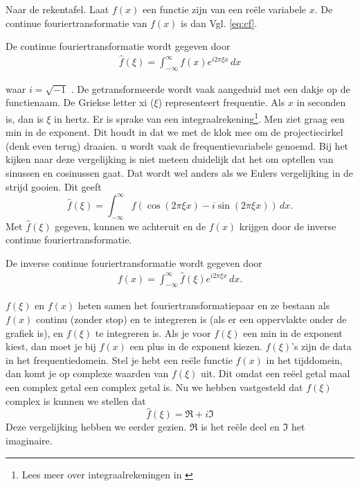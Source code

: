 \documentclass[11pt,fleqn]{book} %
\begin{document}
Naar de rekentafel. Laat $f(x)$ een functie zijn van een reële variabele $x$. De continue fouriertransformatie van $f(x)$ is dan Vgl. \ref{eq:cf}.
\begin{definition}\label{eq:cf}
De continue fouriertransformatie wordt gegeven door
\begin{align}
\hat{f}(\xi)=\int_{-\infty}^\infty f(x)e^{i2\pi \xi x} \, dx
\end{align}
\end{definition}

waar $i = \sqrt{-1}$ \cite{yy}. De getransformeerde wordt vaak aangeduid met een dakje op de functienaam. De Griekse letter xi ($\xi$) representeert frequentie. Als $x$ in seconden is, dan is $\xi$ in hertz. Er is sprake van een integraalrekening\footnote{Lees meer over integraalrekeningen in \cite{int}}. Men ziet graag een min in de exponent. Dit houdt in dat we met de klok mee om de projectiecirkel (denk even terug) draaien. u wordt vaak de frequentievariabele genoemd. Bij het kijken naar deze vergelijking is niet meteen duidelijk dat het om optellen van sinussen en cosinussen gaat. Dat wordt wel anders als we Eulers vergelijking in de strijd gooien. Dit geeft
\begin{equation*}
\hat{f}(\xi)=\int_{-\infty}^\infty f(\cos{(2\pi \xi x)}-i\sin{(2\pi \xi x)})\, dx.
\end{equation*}
Met $\hat{f}(\xi)$ gegeven, kunnen we achteruit en de $f(x)$ krijgen door de inverse continue fouriertransformatie.
\begin{definition} \label{eq:icf}
De inverse continue fouriertransformatie wordt gegeven door
\begin{align}
f(x)=\int_{-\infty}^\infty \hat{f}(\xi)e^{i2\pi \xi x} \, dx.
\end{align}
\end{definition}

$f(\xi)$ en $f(x)$ heten samen het fouriertransformatiepaar en ze bestaan als $f(x)$ continu (zonder stop) en te integreren is (als er een oppervlakte onder de grafiek is), en $f(\xi)$ te integreren is. Als je voor $f(\xi)$ een min in de exponent kiest, dan moet je bij $f(x)$ een plus in de exponent kiezen.
$f(\xi)$'s zijn de data in het frequentiedomein. Stel je hebt een reële functie $f(x)$ in het tijddomein, dan komt je op complexe waarden van $f(\xi)$ uit. Dit omdat een reëel getal maal een complex getal een complex getal is. Nu we hebben vastgesteld dat $f(\xi)$ complex is kunnen we stellen dat
\begin{equation*}
\hat{f}(\xi)=\Re + i\Im
\end{equation*}
Deze vergelijking hebben we eerder gezien. $\Re$ is het reële deel en $\Im$ het imaginaire.
\end{document}
